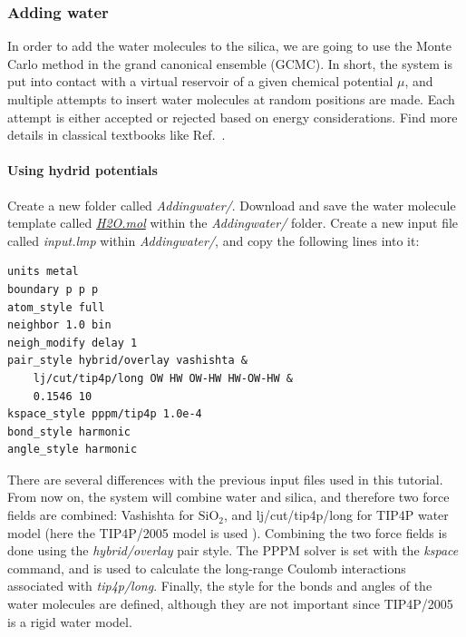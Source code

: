 \documentclass[9pt,tutorial]{livecoms}
\begin{document}
\subsubsection{Adding water}
\noindent In order to add the water molecules to the silica, we are going to use
the Monte Carlo method in the grand canonical ensemble (GCMC). In short, the
system is put into contact with a virtual reservoir of a given chemical potential
$\mu$, and multiple attempts to insert water molecules at random positions are
made. Each attempt is either accepted or rejected based on energy considerations.
Find more details in classical textbooks like Ref.~.

\paragraph{Using hydrid potentials}
\noindent Create a new folder called \textit{Addingwater/}. Download and save
the water molecule template called
\href{https://raw.githubusercontent.com/lammpstutorials/lammpstutorials-article/main/files/tutorial6/H2O.mol}{\textit{H2O.mol}}
within the \textit{Addingwater/} folder. Create a new input file called \textit{input.lmp}
within \textit{Addingwater/}, and copy the following lines into it:
{\normalsize \begin{verbatim}
units metal
boundary p p p
atom_style full
neighbor 1.0 bin
neigh_modify delay 1
pair_style hybrid/overlay vashishta &
    lj/cut/tip4p/long OW HW OW-HW HW-OW-HW &
    0.1546 10
kspace_style pppm/tip4p 1.0e-4
bond_style harmonic
angle_style harmonic
\end{verbatim}}
There are several differences with the previous input files used in this tutorial.
From now on, the system will combine water and silica, and therefore two force
fields are combined: Vashishta for $\text{SiO}_2$, and lj/cut/tip4p/long for
TIP4P water model (here the TIP4P/2005 model is used \cite{abascal2005general}).
Combining the two force fields is done using the \textit{hybrid/overlay} pair
style. The PPPM solver \cite{luty1996calculating} is set with the \textit{kspace}
command, and is used to calculate the long-range Coulomb interactions associated
with \textit{tip4p/long}. Finally, the style for the bonds
and angles of the water molecules are defined, although they are not important
since TIP4P/2005 is a rigid water model.
\end{document}
